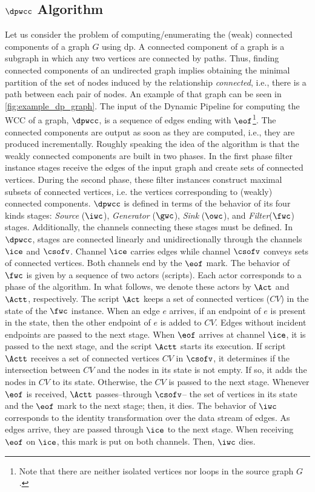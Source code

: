 \subsection{$\dpwcc$ Algorithm}
Let us consider the problem of computing/enumerating the (weak) connected components of a graph $G$ using \acrshort{dp}. 
A connected component of a graph is a subgraph in which any two vertices are connected by paths.  
Thus, finding connected components of an undirected graph implies obtaining the minimal partition of the set of nodes induced by the relationship \textit{connected}, i.e., there is a path between each pair of nodes. An example of that graph can be seen in \autoref{fig:example_dp_graph}.
The input of the Dynamic Pipeline for computing the WCC of a graph, $\dpwcc$, is a sequence of edges ending with $\eof$\footnote{Note that there are neither isolated vertices nor loops in the source graph $G$.}. The connected components are output as soon as they are computed, i.e., they are produced incrementally. 
Roughly speaking the idea of the algorithm is that the weakly connected components are built in two phases. In the first phase filter instance stages receive the edges of the input graph and create sets of connected vertices. 
During the second phase, these filter instances construct maximal subsets of connected vertices, i.e. the vertices corresponding to (weakly) connected components.
%
$\dpwcc$ is defined in terms of the behavior of its four kinds stages: \textit{Source} ($\iwc$),  \textit{Generator} ($\gwc$),  \textit{Sink} ($\owc$), and \textit{Filter}($\fwc$) stages. Additionally,  the channels connecting these stages must be defined. 
In $\dpwcc$, stages are connected linearly and unidirectionally through the channels $\ice$ and  $\csofv$. Channel $\ice$ carries edges while channel  $\csofv$ conveys sets of connected vertices. Both channels end by the $\eof$ mark. 
The behavior of $\fwc$ is given by a sequence of two actors (scripts). Each actor corresponds to a phase of the algorithm. In what follows, we denote these actors by $\Act$ and $\Actt$, respectively. 
The script $\Act$ keeps a set of connected vertices ($CV$) in the state of the $\fwc$ instance. When an edge $e$ arrives, if an endpoint of $e$ is present in the state, then the other endpoint of $e$ is added to $CV$. 
Edges without incident endpoints are passed to the next stage. When $\eof$ arrives at channel $\ice$, it is passed to the next stage, and the script $\Actt$ starts its execution. 
If script $\Actt$ receives a set of connected vertices $CV$ in $\csofv$, it determines if the intersection between $CV$ and the nodes in its state is not empty. If so, it adds the nodes in $CV$  to its state. 
Otherwise, the $CV$ is passed to the next stage.  Whenever $\eof$ is received, $\Actt$ passes--through $\csofv$-- the set of vertices in its state and the $\eof$ mark to the next stage; then, it dies.
The behavior of $\iwc$ corresponds to the identity transformation over the data stream of edges.  As edges arrive, they are passed through  $\ice$ to the next stage. When receiving $\eof$ on $\ice$, this mark is put on both channels. 
Then, $\iwc$ dies. 

